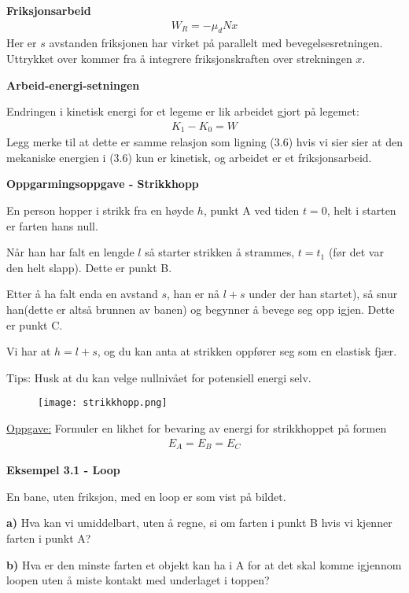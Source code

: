 \documentclass[11pt,a4paper]{article}
\numberwithin{equation}{section}
\begin{document}
\textbf{Friksjonsarbeid}
\begin{align}
W_R = -\mu_d Nx
\end{align}
Her er $s$ avstanden friksjonen har virket på parallelt med bevegelsesretningen. Uttrykket over kommer fra å integrere friksjonskraften over strekningen $x$. 

\textbf{Arbeid-energi-setningen}

Endringen i kinetisk energi for et legeme er lik arbeidet gjort på legemet:
\begin{align}
K_1-K_0 = W
\end{align}
Legg merke til at dette er samme relasjon som ligning (3.6) hvis vi sier sier at den mekaniske energien i (3.6) kun er kinetisk, og arbeidet er et friksjonsarbeid.  

\textbf{Oppgarmingsoppgave - Strikkhopp}

En person hopper i strikk fra en høyde $h$, punkt A ved tiden $t=0$, helt i starten er farten hans null.

Når han har falt en lengde $l$ så starter strikken å strammes, $t=t_1$ (før det var den helt slapp). Dette er punkt B.

Etter å ha falt enda en avstand $s$, han er nå $l+s$ under der han startet), så snur han(dette er altså brunnen av banen) og begynner å bevege seg opp igjen. Dette er punkt C. 

Vi har at $h = l + s$, og du kan anta at strikken oppfører seg som en elastisk fjær. 

Tips: Husk at du kan velge nullnivået for potensiell energi selv.

\begin{figure}[h!]
\begin{center}
  \texttt{[image: strikkhopp.png]}
  \end{center}
\end{figure}

\underline{Oppgave:} Formuler en likhet for bevaring av energi for strikkhoppet på formen
\begin{align*}
E_A = E_B = E_C
\end{align*} 


\textbf{Eksempel 3.1 - Loop}

En bane, uten friksjon, med en loop er som vist på bildet.

\textbf{a)} Hva kan vi umiddelbart, uten å regne, si om farten i punkt B hvis vi kjenner farten i punkt A?

\textbf{b)} Hva er den minste farten et objekt kan ha i A for at det skal komme igjennom loopen uten å miste kontakt med underlaget i toppen? 
\end{document}
